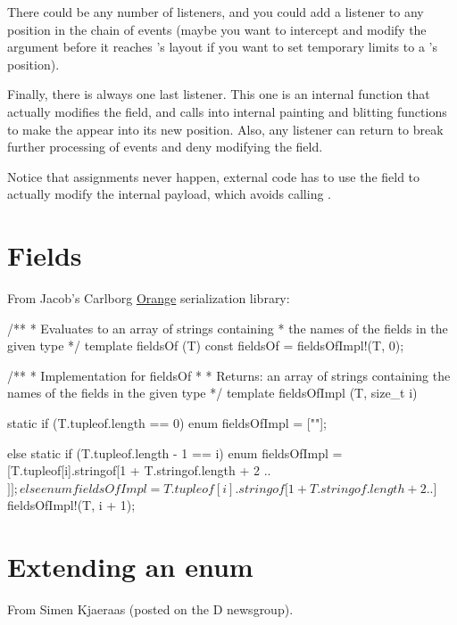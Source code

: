 There could be any number of listeners, and you could add a listener to any position in the chain of events (maybe you want to intercept and modify the argument before it reaches 's layout if you want to set temporary limits to a 's position).

Finally, there is always one last listener. This one is an internal function that actually modifies the  field, and calls into internal painting and blitting functions to make the  appear into its new position. Also, any listener can return  to break further processing of events and deny modifying the field.

Notice that assignments never happen, external code has to use the  field to actually modify the internal payload, which avoids calling .

\section{Fields}

From Jacob's Carlborg \href{https://github.com/jacob-carlborg/orange}{Orange} serialization library:

\begin{dcode}
/**
 * Evaluates to an array of strings containing 
 * the names of the fields in the given type
 */
template fieldsOf (T)
{
	const fieldsOf = fieldsOfImpl!(T, 0);
}

/**
 * Implementation for fieldsOf
 * 
 * Returns: an array of strings containing the names of the fields in the given type
 */
template fieldsOfImpl (T, size_t i)
{
    static if (T.tupleof.length == 0)
        enum fieldsOfImpl = [""];

    else static if (T.tupleof.length - 1 == i)
        enum fieldsOfImpl = [T.tupleof[i].stringof[1 + T.stringof.length + 2 .. $]];

    else
        enum fieldsOfImpl = T.tupleof[i].stringof[1 + T.stringof.length + 2 .. $] ~ fieldsOfImpl!(T, i + 1);
}
\end{dcode}

\section{Extending an enum}

From Simen Kjaeraas (posted on the D newsgroup).

